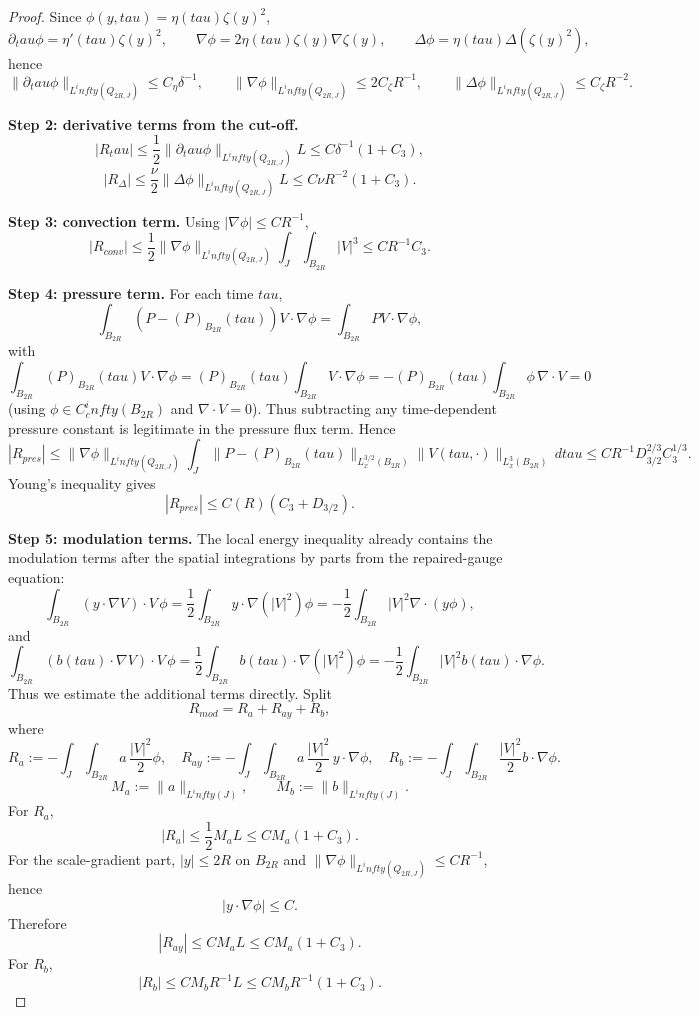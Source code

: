 \documentclass[11pt]{amsart}
\def\mathrm#1{#1}%
\def\tau{tau}%
\def\infty{infty}%
\theoremstyle{plain}
\theoremstyle{definition}
\theoremstyle{remark}
\begin{document}
\begin{proof}
Since $\phi(y,\tau)=\eta(\tau)\zeta(y)^2$,
\[
\partial_\tau\phi=\eta'(\tau)\zeta(y)^2,
\qquad
\nabla\phi=2\eta(\tau)\zeta(y)\nabla\zeta(y),
\qquad
\Delta\phi=\eta(\tau)\Delta(\zeta(y)^2),
\]
hence
\[
\|\partial_\tau\phi\|_{L^\infty(Q_{2R,J})}\le C_\eta\delta^{-1},
\qquad
\|\nabla\phi\|_{L^\infty(Q_{2R,J})}\le 2C_\zeta R^{-1},
\qquad
\|\Delta\phi\|_{L^\infty(Q_{2R,J})}\le C_\zeta R^{-2}.
\]

\textbf{Step 2: derivative terms from the cut-off.}
\[
|R_\tau|
\le\frac12\|\partial_\tau\phi\|_{L^\infty(Q_{2R,J})}L
\le C\delta^{-1}(1+C_3),
\]
\[
|R_\Delta|
\le\frac{\nu}{2}\|\Delta\phi\|_{L^\infty(Q_{2R,J})}L
\le C\nu R^{-2}(1+C_3).
\]

\textbf{Step 3: convection term.}
Using $|\nabla\phi|\le CR^{-1}$,
\[
|R_{\mathrm{conv}}|
\le \frac12\|\nabla\phi\|_{L^\infty(Q_{2R,J})}\int_J\!\int_{B_{2R}}|V|^3
\le CR^{-1}C_3.
\]

\textbf{Step 4: pressure term.}
For each time $\tau$,
\[
\int_{B_{2R}}(P-(P)_{B_{2R}}(\tau))V\cdot \nabla\phi
=\int_{B_{2R}}PV\cdot \nabla\phi,
\]
with
\[
\int_{B_{2R}}(P)_{B_{2R}}(\tau)V\cdot \nabla\phi
=(P)_{B_{2R}}(\tau)\int_{B_{2R}}V\cdot \nabla\phi
=-(P)_{B_{2R}}(\tau)\int_{B_{2R}}\phi\,\nabla\cdot V=0
\]
(using $\phi\in C_c^\infty(B_{2R})$ and $\nabla\cdot V=0$).
Thus subtracting any time-dependent pressure constant is legitimate in the
pressure flux term.
Hence
\[
|R_{\mathrm{pres}}|
\le\|\nabla\phi\|_{L^\infty(Q_{2R,J})}
\int_J
\|P-(P)_{B_{2R}}(\tau)\|_{L_x^{3/2}(B_{2R})}
\|V(\tau,\cdot)\|_{L_x^3(B_{2R})}
\,d\tau
\le CR^{-1}D_{3/2}^{2/3}C_3^{1/3}.
\]
Young's inequality gives
\[
|R_{\mathrm{pres}}|\le C(R)(C_3+D_{3/2}).
\]

\textbf{Step 5: modulation terms.}
The local energy inequality already contains the modulation terms
after the spatial integrations by parts from the repaired-gauge equation:
\[
\int_{B_{2R}}(y\cdot\nabla V)\cdot V\,\phi
=\frac12\int_{B_{2R}}y\cdot\nabla(|V|^2)\phi
=-\frac12\int_{B_{2R}}|V|^2\nabla\cdot(y\phi),
\]
and
\[
\int_{B_{2R}}(b(\tau)\cdot\nabla V)\cdot V\,\phi
=\frac12\int_{B_{2R}}b(\tau)\cdot\nabla(|V|^2)\phi
=-\frac12\int_{B_{2R}}|V|^2b(\tau)\cdot\nabla\phi.
\]
Thus we estimate the additional terms directly. Split
\[
R_{\mathrm{mod}}=R_a+R_{ay}+R_b,
\]
where
\[
R_a:=-\int_J\!\int_{B_{2R}}a\,\frac{|V|^2}{2}\phi,
\quad
R_{ay}:=-\int_J\!\int_{B_{2R}}a\,\frac{|V|^2}{2}\,y\cdot\nabla\phi,
\quad
R_b:=-\int_J\!\int_{B_{2R}}\frac{|V|^2}{2}b\cdot\nabla\phi.
\]
\[
M_a:=\|a\|_{L^\infty(J)},\qquad M_b:=\|b\|_{L^\infty(J)}.
\]
For $R_a$,
\[
|R_a|
\le \frac12 M_aL
\le C M_a(1+C_3).
\]
For the scale-gradient part, $|y|\le2R$ on $B_{2R}$ and
$\|\nabla\phi\|_{L^\infty(Q_{2R,J})}\le CR^{-1}$, hence
\[
|y\cdot\nabla\phi|\le C.
\]
Therefore
\[
|R_{ay}|\le C M_aL\le C M_a(1+C_3).
\]
For $R_b$,
\[
|R_b|\le C M_bR^{-1}L\le C M_bR^{-1}(1+C_3).
\]


\end{proof}
\end{document}
